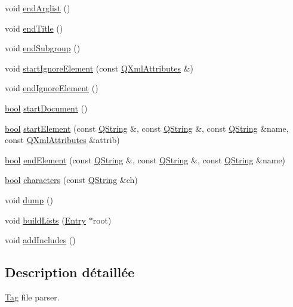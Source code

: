 \begin{DoxyCompactItemize}
\item 
void \hyperlink{class_tag_file_parser_a683c1db16fb9938e213516a668d387b2}{end\+Arglist} ()
\item 
void \hyperlink{class_tag_file_parser_a3210a7d1250f47f40e9e7e2e55fcbaf6}{end\+Title} ()
\item 
void \hyperlink{class_tag_file_parser_a63cb54e8b8b03819af5ff4464f134509}{end\+Subgroup} ()
\item 
void \hyperlink{class_tag_file_parser_acb04850b5bd3986ae23351a81ee8c947}{start\+Ignore\+Element} (const \hyperlink{class_q_xml_attributes}{Q\+Xml\+Attributes} \&)
\item 
void \hyperlink{class_tag_file_parser_af0f86acf5070e1450ebd7afe2f0756df}{end\+Ignore\+Element} ()
\item 
\hyperlink{qglobal_8h_a1062901a7428fdd9c7f180f5e01ea056}{bool} \hyperlink{class_tag_file_parser_a56d1a932efadb2ddd7e459884ebab4e4}{start\+Document} ()
\item 
\hyperlink{qglobal_8h_a1062901a7428fdd9c7f180f5e01ea056}{bool} \hyperlink{class_tag_file_parser_ad9f6b4e83d37df58b95a2018d4e2e606}{start\+Element} (const \hyperlink{class_q_string}{Q\+String} \&, const \hyperlink{class_q_string}{Q\+String} \&, const \hyperlink{class_q_string}{Q\+String} \&name, const \hyperlink{class_q_xml_attributes}{Q\+Xml\+Attributes} \&attrib)
\item 
\hyperlink{qglobal_8h_a1062901a7428fdd9c7f180f5e01ea056}{bool} \hyperlink{class_tag_file_parser_aeb0fd2877b6d5fc40a15f7c7bec19ee0}{end\+Element} (const \hyperlink{class_q_string}{Q\+String} \&, const \hyperlink{class_q_string}{Q\+String} \&, const \hyperlink{class_q_string}{Q\+String} \&name)
\item 
\hyperlink{qglobal_8h_a1062901a7428fdd9c7f180f5e01ea056}{bool} \hyperlink{class_tag_file_parser_a3d80deca329fd56350927d24c84a21b1}{characters} (const \hyperlink{class_q_string}{Q\+String} \&ch)
\item 
void \hyperlink{class_tag_file_parser_adce233a37587ff0cc0753ae672f67d25}{dump} ()
\item 
void \hyperlink{class_tag_file_parser_a92748cf53ec12acd05e1003b1fcd34e1}{build\+Lists} (\hyperlink{class_entry}{Entry} $\ast$root)
\item 
void \hyperlink{class_tag_file_parser_ab88c5f05236839ab0744c9e08d1c77e4}{add\+Includes} ()
\end{DoxyCompactItemize}


\subsection{Description détaillée}
\hyperlink{class_tag}{Tag} file parser.

